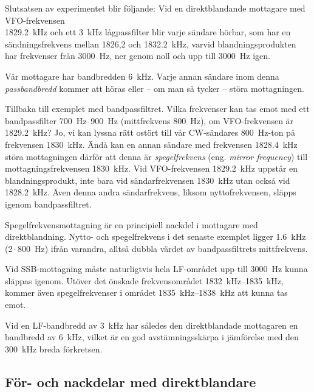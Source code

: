Slutsatsen av experimentet blir följande:
Vid en direktblandande mottagare med VFO-frekvensen \\ \SI{1829,2}{\kilo\hertz}
och ett \SI{3}{\kilo\hertz} lågpassfilter blir varje sändare hörbar, som har en
sändningsfrekvens mellan 1826,2 och \SI{1832,2}{\kilo\hertz}, varvid
blandningsprodukten har frekvenser från \SI{3000}{\hertz}, ner genom noll och
upp till \SI{3000}{\hertz} igen.


Vår mottagare har bandbredden \SI{6}{\kilo\hertz}.
Varje annan sändare inom denna \emph{passbandbredd} kommer att höras eller --
om man så tycker -- störa mottagningen.

Tillbaka till exemplet med bandpassfiltret.
Vilka frekvenser kan tas emot med ett bandpassfilter \SIrange{700}{900}{\hertz}
(mittfrekvens \SI{800}{\hertz}), om VFO-frekvensen är \SI{1829,2}{\kilo\hertz}?
Jo, vi kan lyssna rätt ostört till vår CW-sändares \SI{800}{\hertz}-ton på
frekvensen \SI{1830}{\kilo\hertz}.
Ändå kan en annan sändare med frekvensen \SI{1828,4}{\kilo\hertz} störa
mottagningen därför att denna är \emph{spegelfrekvens} (eng. \emph{mirror
frequency}) till mottagningsfrekvensen \SI{1830}{\kilo\hertz}.
Vid VFO-frekvensen \SI{1829,2}{\kilo\hertz} uppstår en blandningsprodukt, inte
bara vid sändarfrekvensen \SI{1830}{\kilo\hertz} utan också vid
\SI{1828,2}{\kilo\hertz}.
Även denna andra sändarfrekvens, liksom nyttofrekvensen, släpps igenom
bandpassfiltret.

Spegelfrekvensmottagning är en principiell nackdel i mottagare med
direktblandning.
Nytto- och spegelfrekvens i det senaste exemplet ligger
\SI{1,6}{\kilo\hertz} ($2\cdot 800$~\si{\hertz}) ifrån varandra, alltså dubbla värdet
av bandpassfiltrets mittfrekvens.

Vid SSB-mottagning måste naturligtvis hela LF-området upp till \SI{3000}{\hertz}
kunna släppas igenom.
Utöver det önskade frekvensområdet \SIrange{1832}{1835}{\kilo\hertz}, kommer
även spegelfrekvenser i området \SIrange{1835}{1838}{\kilo\hertz} att kunna tas
emot.

Vid en LF-bandbredd av \SI{3}{\kilo\hertz} har således den direktblandade
mottagaren en bandbredd av \SI{6}{\kilo\hertz}, vilket är en god
avstämningsskärpa i jämförelse med den \SI{300}{\kilo\hertz} breda förkretsen.

\subsection{För- och nackdelar med direkt\-blandare}

